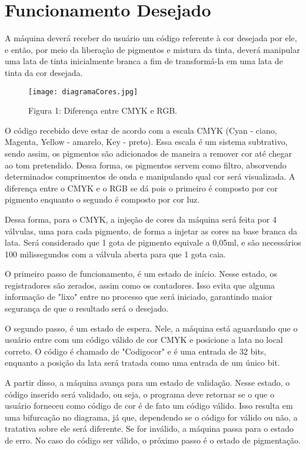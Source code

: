 \documentclass[12pt,a4paper,oneside]{abntex2}
\begin{document}
        \section{Funcionamento Desejado}
            A máquina deverá receber do usuário um código referente à cor desejada por ele, e então, por meio da liberação de pigmentos e mistura da tinta, deverá manipular uma lata de tinta inicialmente branca a fim de transformá-la em uma lata de tinta da cor desejada. \par
            \begin{figure}[h]
                \centering
                \texttt{[image: diagramaCores.jpg]}
                \caption{Figura 1: Diferença entre CMYK e RGB.}
                \label{fig:cores}
            \end{figure}
            O código recebido deve estar de acordo com a escala CMYK (Cyan - ciano, Magenta, Yellow - amarelo, Key - preto). Essa escala é um sistema subtrativo, sendo assim, os pigmentos são adicionados de maneira a remover cor até chegar ao tom pretendido. Dessa forma, os pigmentos servem como filtro, absorvendo determinados comprimentos de onda e manipulando qual cor será visualizada. A diferença entre o CMYK e o RGB se dá pois o primeiro é composto por cor pigmento enquanto o segundo é composto por cor luz.\par
            Dessa forma, para o CMYK, a injeção de cores da máquina será feita por 4 válvulas, uma para cada pigmento, de forma a injetar as cores na base branca da lata. Será considerado que 1 gota de pigmento equivale a 0,05ml, e são necessários 100 milissegundos com a válvula aberta para que 1 gota caia.\par
            O primeiro passo de funcionamento, é um estado de início. Nesse estado, os registradores são zerados, assim como os contadores. Isso evita que alguma informação de "lixo" entre no processo que será iniciado, garantindo maior segurança de que o resultado será o desejado.\par
            O segundo passo, é um estado de espera. Nele, a máquina está aguardando que o usuário entre com um código válido de cor CMYK e posicione a lata no local correto. O código é chamado de "Codigo\textunderscore cor" e é uma entrada de 32 bits, enquanto a posição da lata será tratada como uma entrada de um único bit.\par
            A partir disso, a máquina avança para um estado de validação. Nesse estado, o código inserido será validado, ou seja, o programa deve retornar se o que o usuário forneceu como código de cor é de fato um código válido. Isso resulta em uma bifurcação no diagrama, já que, dependendo se o código for válido ou não, a tratativa sobre ele será diferente. Se for inválido, a máquina passa para o estado de erro. No caso do código ser válido, o próximo passo é o estado de pigmentação.\par
\end{document}
